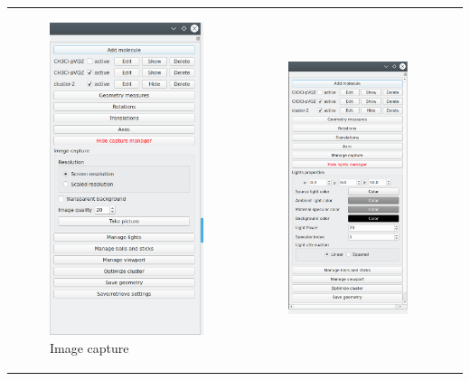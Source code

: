 \documentclass[10pt]{article}
\begin{document}
\begin{tabular}{lcr}
\begin{minipage}{.45\linewidth}
\begin{figure}[H]
    \begin{center}
        \includegraphics[width=0.4\linewidth]{damqt320_capture.png}
    \end{center}
    \caption{Image capture \label{fig:4_6}}
\end{figure}
\end{minipage}
&
\begin{minipage}{.45\linewidth}
    \begin{figure}[H]
        \begin{center}
            \vspace*{0mm}
            \includegraphics[width=0.39\linewidth]{damqt320_lights.png}

\end{center}
\end{figure}
\end{minipage}
\end{tabular}
\end{document}
